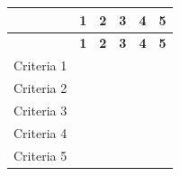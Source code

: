 \documentclass[10pt,letterpaper]{article}
\renewcommand\arraystretch{1.25}
\begin{document}
\begin{center}
\begingroup
\setlength\tabcolsep{2.0pt}
\scriptsize
\renewcommand\arraystretch{1.55}
\begin{longtable}{|>{\raggedright\arraybackslash}p{0.995in}|>{\raggedright\arraybackslash}p{0.995in}|>{\raggedright\arraybackslash}p{0.995in}|>{\raggedright\arraybackslash}p{0.995in}|>{\raggedright\arraybackslash}p{0.995in}|>{\raggedright\arraybackslash}p{0.995in}|}
\hline
\rowcolor{light}
\rule{0pt}{11pt}\hspace{0pt} & \textbf{1} & \textbf{2} & \textbf{3} & \textbf{4} & \textbf{5} \\ \hline
\endfirsthead
\hline\rowcolor{light} \rule{0pt}{11pt}\hspace{0pt} & \textbf{1} & \textbf{2} & \textbf{3} & \textbf{4} & \textbf{5} \\ \hline
\endhead
Criteria 1 & \rule{0pt}{11pt}\hspace{0pt} & \rule{0pt}{11pt}\hspace{0pt} & \rule{0pt}{11pt}\hspace{0pt} & \rule{0pt}{11pt}\hspace{0pt} & \rule{0pt}{11pt}\hspace{0pt} \\ \hline
Criteria 2 & \rule{0pt}{11pt}\hspace{0pt} & \rule{0pt}{11pt}\hspace{0pt} & \rule{0pt}{11pt}\hspace{0pt} & \rule{0pt}{11pt}\hspace{0pt} & \rule{0pt}{11pt}\hspace{0pt} \\ \hline
Criteria 3 & \rule{0pt}{11pt}\hspace{0pt} & \rule{0pt}{11pt}\hspace{0pt} & \rule{0pt}{11pt}\hspace{0pt} & \rule{0pt}{11pt}\hspace{0pt} & \rule{0pt}{11pt}\hspace{0pt} \\ \hline
Criteria 4 & \rule{0pt}{11pt}\hspace{0pt} & \rule{0pt}{11pt}\hspace{0pt} & \rule{0pt}{11pt}\hspace{0pt} & \rule{0pt}{11pt}\hspace{0pt} & \rule{0pt}{11pt}\hspace{0pt} \\ \hline
Criteria 5 & \rule{0pt}{11pt}\hspace{0pt} & \rule{0pt}{11pt}\hspace{0pt} & \rule{0pt}{11pt}\hspace{0pt} & \rule{0pt}{11pt}\hspace{0pt} & \rule{0pt}{11pt}\hspace{0pt} \\ \hline
\end{longtable}
\endgroup
\end{center}
\end{document}

